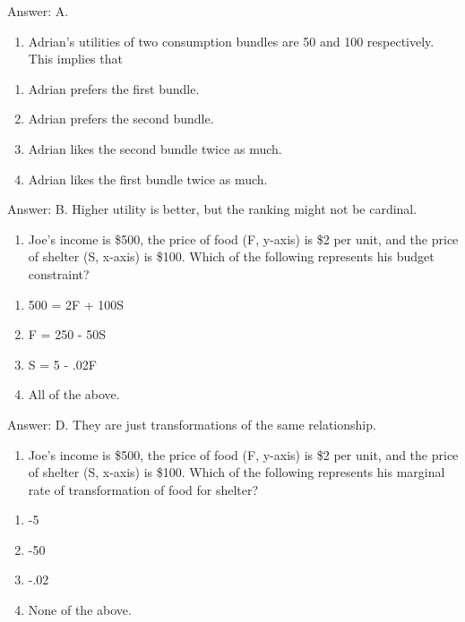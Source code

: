 \documentclass[11pt,]{article}
\providecommand{\tightlist}{%
  \setlength{\itemsep}{0pt}\setlength{\parskip}{0pt}}
\begin{document}
Answer: A.

\begin{enumerate}
\def\labelenumi{\arabic{enumi})}
\setcounter{enumi}{12}
\tightlist
\item
  Adrian's utilities of two consumption bundles are 50 and 100
  respectively. This implies that
\end{enumerate}

\begin{enumerate}
\def\labelenumi{\Alph{enumi})}
\tightlist
\item
  Adrian prefers the first bundle.
\item
  Adrian prefers the second bundle.
\item
  Adrian likes the second bundle twice as much.
\item
  Adrian likes the first bundle twice as much.
\end{enumerate}

Answer: B. Higher utility is better, but the ranking might not be
cardinal.

\begin{enumerate}
\def\labelenumi{\arabic{enumi})}
\setcounter{enumi}{13}
\tightlist
\item
  Joe's income is \$500, the price of food (F, y-axis) is \$2 per unit,
  and the price of shelter (S, x-axis) is \$100. Which of the following
  represents his budget constraint?
\end{enumerate}

\begin{enumerate}
\def\labelenumi{\Alph{enumi})}
\tightlist
\item
  500 = 2F + 100S
\item
  F = 250 - 50S
\item
  S = 5 - .02F
\item
  All of the above.
\end{enumerate}

Answer: D. They are just transformations of the same relationship.

\begin{enumerate}
\def\labelenumi{\arabic{enumi})}
\setcounter{enumi}{14}
\tightlist
\item
  Joe's income is \$500, the price of food (F, y-axis) is \$2 per unit,
  and the price of shelter (S, x-axis) is \$100. Which of the following
  represents his marginal rate of transformation of food for shelter?
\end{enumerate}

\begin{enumerate}
\def\labelenumi{\Alph{enumi})}
\tightlist
\item
  -5
\item
  -50
\item
  -.02
\item
  None of the above.
\end{enumerate}
\end{document}
